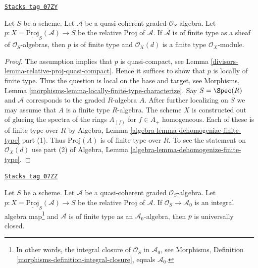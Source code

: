 \begin{lemma}
\label{divisors-lemma-relative-proj-finite-type}
\href{https://stacks.math.columbia.edu/tag/07ZY}{\texttt{Stacks tag 07ZY}}

Let $S$ be a scheme. Let $\mathcal{A}$ be a quasi-coherent graded
$\mathcal{O}_S$-algebra. Let
$p : X = \underline{\text{Proj}}_S(\mathcal{A}) \to S$ be the relative
Proj of $\mathcal{A}$. If $\mathcal{A}$ is of finite type as a sheaf of
$\mathcal{O}_S$-algebras, then $p$ is of finite type and $\mathcal{O}_X(d)$
is a finite type $\mathcal{O}_X$-module.
\end{lemma}

\begin{proof}

The assumption implies that $p$ is quasi-compact, see
Lemma \ref{divisors-lemma-relative-proj-quasi-compact}. Hence it suffices
to show that $p$ is locally of finite type.
Thus the question is local on the base and target, see
Morphisms, Lemma \ref{morphisms-lemma-locally-finite-type-characterize}.
Say $S = \Spec(R)$ and $\mathcal{A}$ corresponds to the
graded $R$-algebra $A$. After further localizing on $S$ we may
assume that $A$ is a finite type $R$-algebra. The scheme $X$ is constructed
out of glueing the spectra of the rings $A_{(f)}$ for $f \in A_{+}$
homogeneous. Each of these is of finite type over $R$ by
Algebra, Lemma \ref{algebra-lemma-dehomogenize-finite-type} part (1).
Thus $\text{Proj}(A)$ is of finite type over $R$.
To see the statement on $\mathcal{O}_X(d)$ use part (2) of
Algebra, Lemma \ref{algebra-lemma-dehomogenize-finite-type}.
\end{proof}

\begin{lemma}
\label{divisors-lemma-relative-proj-universally-closed}
\href{https://stacks.math.columbia.edu/tag/07ZZ}{\texttt{Stacks tag 07ZZ}}

Let $S$ be a scheme. Let $\mathcal{A}$ be a quasi-coherent graded
$\mathcal{O}_S$-algebra. Let
$p : X = \underline{\text{Proj}}_S(\mathcal{A}) \to S$ be the relative
Proj of $\mathcal{A}$. If $\mathcal{O}_S \to \mathcal{A}_0$
is an integral algebra map\footnote{In other words, the integral
closure of $\mathcal{O}_S$ in $\mathcal{A}_0$, see
Morphisms, Definition \ref{morphisms-definition-integral-closure}, equals
$\mathcal{A}_0$.} and $\mathcal{A}$ is of finite type as an
$\mathcal{A}_0$-algebra, then $p$ is universally closed.
\end{lemma}

